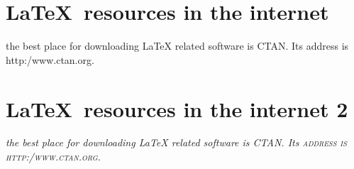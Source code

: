 \documentclass{article}
\begin{document}
\section{\sffamily\LaTeX\ resources in the internet}
the best place for downloading LaTeX related software is CTAN.
Its address is \ttfamily http:/www.ctan.org\rmfamily.



\section{\sffamily\LaTeX\ resources in the internet 2}
\em the best place for downloading \em LaTeX related \slshape software is CTAN.
Its \scshape address is \ttfamily http:/www.ctan.org\rmfamily.
\end{document}
